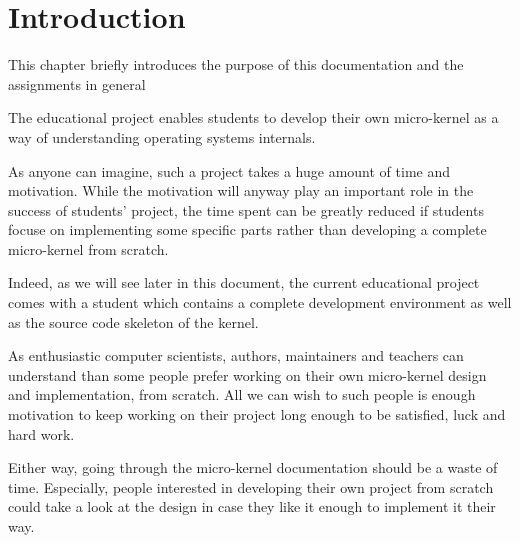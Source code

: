 %
%
%
%
%
%

%
%

\chapter{Introduction}
\label{chapter:introduction}

This chapter briefly introduces the purpose of this documentation
and the assignments in general

\newpage

%
%

The  educational project enables students to develop their own
micro-kernel as a way of understanding operating systems internals.

As anyone can imagine, such a project takes a huge amount of time and
motivation. While the motivation will anyway play an important role in the
success of students' project, the time spent can be greatly reduced if
students focuse on implementing some specific parts rather than developing a
complete micro-kernel from scratch.

Indeed, as we will see later in this document, the current 
educational project comes with a student  which contains
a complete development environment as well as the source code skeleton of
the kernel.

As enthusiastic computer scientists,  authors, maintainers and
teachers can understand than some people prefer working on their own
micro-kernel design and implementation, from scratch. All we can wish to
such people is enough motivation to keep working on their project long
enough to be satisfied, luck and hard work.

Either way, going through the  micro-kernel documentation
should be a waste of time. Especially, people interested in developing their
own project from scratch could take a look at the  design
in case they like it enough to implement it their way.

